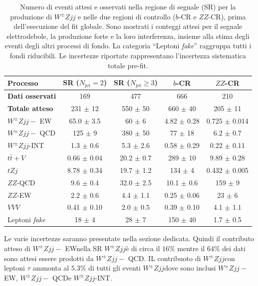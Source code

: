 \documentclass[11pt]{article}
\newcommand{\wzjjew}{$W^\pm Z jj-$ EW}
\newcommand{\wzjjqcd}{$W^\pm Z jj-$ QCD}
\newcommand{\wzjj}{$W^\pm Z jj$}
\begin{document}
\begin{table}[htbp] 
\centering
\renewcommand{\arraystretch}{1.4} %
\begin{tabular}{l c c c c}
\hline
\textbf{Processo} & \textbf{SR ($N_{\text{jet}} = 2$)} & \textbf{SR ($N_{\text{jet}} \ge 3$)} & \textbf{$b$-CR} & \textbf{$ZZ$-CR} \\
\hline
\hline
\textbf{Dati osservati} & 169 & 477 & 666 & 210 \\
\textbf{Totale atteso} & 231 $\pm$ 12 & 550 $\pm$ 50 & 660 $\pm$ 40 & 205 $\pm$ 11 \\
\hline
\wzjjew & 65.0 $\pm$ 3.5 & 60 $\pm$ 6 & 4.82 $\pm$ 0.28 & 0.725 $\pm$ 0.014 \\
\wzjjqcd & 125 $\pm$ 9 & 380 $\pm$ 50 & 77 $\pm$ 18 & 6.2 $\pm$ 0.7 \\
\wzjj-INT & 1.3 $\pm$ 0.6 & 5.3 $\pm$ 2.6 & 0.58 $\pm$ 0.29 & 0.22 $\pm$ 0.11 \\
$t\bar{t}+V$ & 0.66 $\pm$ 0.04 & 20.2 $\pm$ 0.7 & 289 $\pm$ 10 & 9.89 $\pm$ 0.28 \\
$tZj$ & 8.78 $\pm$ 0.34 & 19.7 $\pm$ 1.2 & 134 $\pm$ 4 & 0.432 $\pm$ 0.005 \\
$ZZ$-QCD & 9.6 $\pm$ 0.4 & 32.0 $\pm$ 2.5 & 10.1 $\pm$ 0.6 & 159 $\pm$ 9 \\
$ZZ$-EW & 2.2 $\pm$ 0.6 & 4.4 $\pm$ 1.1 & 0.25 $\pm$ 0.06 & 23 $\pm$ 6 \\
$VVV$ & 0.41 $\pm$ 0.10 & 2.0 $\pm$ 0.5 & 0.39 $\pm$ 0.10 & 4.1 $\pm$ 1.1 \\
Leptoni \textit{fake} & 18 $\pm$ 4 & 28 $\pm$ 7 & 150 $\pm$ 40 & 1.7 $\pm$ 0.5 \\
\hline
\end{tabular}
\caption{Numero di eventi attesi e osservati nella regione di segnale (SR) per la produzione di $W^\pm Zjj$ e nelle due regioni di controllo ($b$-CR e $ZZ$-CR), prima dell'esecuzione del fit globale. Sono mostrati i conteggi attesi per il segnale elettrodebole, la produzione forte e la loro interferenza, insieme alla stima degli eventi degli altri processi di fondo. La categoria ``Leptoni \textit{fake}'' raggruppa tutti i fondi riducibili. Le incertezze riportate rappresentano l'incertezza sistematica totale pre-fit.}
\label{tab:VBSyield_prefit}
\end{table}
Le varie incertezze saranno presentate nella sezione dedicata. Quindi il contributo atteso di \wzjjew nella SR \wzjj è di circa il $16\%$ mentre il $64\%$ dei dati sono attesi essere prodotti da \wzjjqcd. IL contribuoto di \wzjj con leptoni $\tau$ ammonta al $5.3\%$ di tutti gli eventi \wzjj dove sono inclusi \wzjjew, \wzjjqcd e \wzjj-INT.
\end{document}
